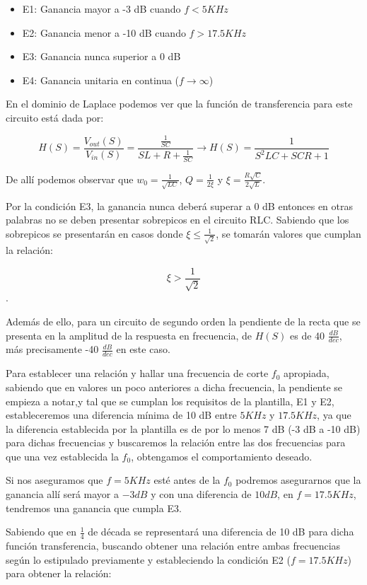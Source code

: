 \begin{itemize}
	\item E1: Ganancia mayor a -3 dB cuando $f < 5 KHz$ 
	\item E2: Ganancia menor a -10 dB cuando $f > 17.5 KHz $
	\item E3: Ganancia nunca superior a 0 dB
	\item E4: Ganancia unitaria en continua ($f \to \infty$)
\end{itemize}

En el dominio de Laplace podemos ver que la función de transferencia para este circuito está dada por:

$$H(S)=\frac{V_{out}(S)}{V_{in}(S)}=\frac{\frac{1}{SC}}{SL+R+\frac{1}{SC}} \longrightarrow 
H(S)=\frac{1}{S^2LC+SCR+1}$$

De allí podemos observar que $w_0=\frac{1}{\sqrt{LC}}$, $Q=\frac{1}{2\xi}$ y $\xi=\frac{R\sqrt{C}}{2\sqrt{L}}$.

Por la condición E3, la ganancia nunca deberá superar a 0 dB entonces en otras palabras no se deben presentar sobrepicos en el circuito RLC.
Sabiendo que los sobrepicos se presentarán en casos donde $\xi \leq \frac{1}{\sqrt{2}}$, se tomarán valores que cumplan la relación:

$$\xi > \frac{1}{\sqrt{2}}$$.

Además de ello, para un circuito de segundo orden la pendiente de la recta que se presenta en la amplitud de la respuesta en frecuencia,
de $H(S)$ es de 40 $\frac{dB}{dec}$, más precisamente -40 $\frac{dB}{dec}$ en este caso. 

Para establecer una relación y hallar una frecuencia de corte $f_0$ apropiada, 
sabiendo que en valores un poco anteriores a dicha frecuencia, la pendiente se empieza a notar,y tal que se cumplan los requisitos
de la plantilla, E1 y E2, estableceremos una diferencia mínima de 10 dB entre $5 KHz$ y $17.5 KHz$, ya que la diferencia establecida por la plantilla
es de por lo menos 7 dB (-3 dB a -10 dB) para dichas frecuencias y buscaremos la relación entre las dos frecuencias para que una vez establecida la $f_0$,
obtengamos el comportamiento deseado.

Si nos aseguramos que $f=5KHz$ esté antes de la $f_0$ podremos asegurarnos que la ganancia allí será mayor a $-3dB$ y con una diferencia de $10 dB$, en $f=17.5 KHz$,
tendremos una ganancia que cumpla E3.

Sabiendo que en $\frac{1}{4}$ de década se representará una diferencia de 10 dB para dicha función transferencia, buscando obtener una
relación entre ambas frecuencias según lo estipulado previamente y estableciendo la condición E2 ($f=17.5 KHz$) para obtener la relación:

